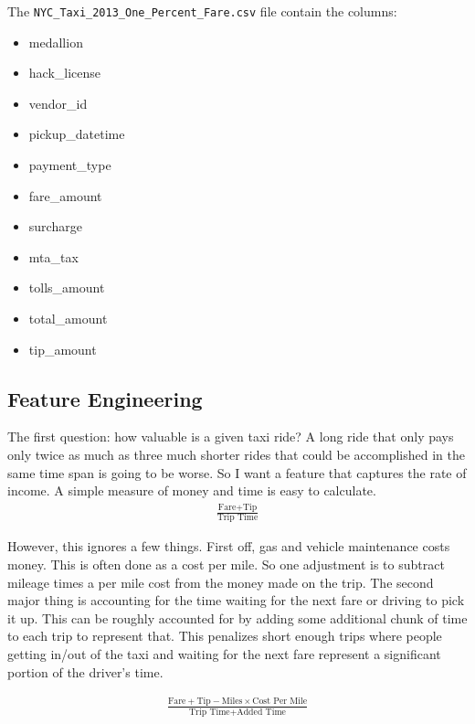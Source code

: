 \documentclass[10pt]{article} %
\begin{document}
The \verb|NYC_Taxi_2013_One_Percent_Fare.csv| file contain the columns:
\begin{multicols}{3}
\begin{itemize}
\item medallion
\item hack\_license
\item vendor\_id
\item pickup\_datetime
\item payment\_type
\item fare\_amount
\item surcharge
\item mta\_tax
\item tolls\_amount
\item total\_amount
\item tip\_amount
\end{itemize}
\end{multicols}

\newpage

\subsection*{Feature Engineering}
The first question: how valuable is a given taxi ride? A long ride that only pays only twice as much as three much shorter rides that could be accomplished in the same time span is going to be worse. So I want a feature that captures the rate of income. A simple measure of money and time is easy to calculate.
\begin{align}
\frac{
\mbox{Fare} +\mbox{Tip}
}
{
\mbox{Trip Time}
}\nonumber
\end{align}

However, this ignores a few things. First off, gas and vehicle maintenance costs money. This is often done as a cost per mile. So one adjustment is to subtract mileage times a per mile cost from the money made on the trip. The second major thing is accounting for the time waiting for the next fare or driving to pick it up. This can be roughly accounted for by adding some additional chunk of time to each trip to represent that. This penalizes short enough trips where people getting in/out of the taxi and waiting for the next fare represent a significant portion of the driver's time.

\begin{align}
\frac{
\mbox{Fare} +\mbox{Tip} -\mbox{Miles}\times\mbox{Cost Per Mile}
}
{
\mbox{Trip Time}+\mbox{Added Time}
}\nonumber
\end{align}
\end{document}
